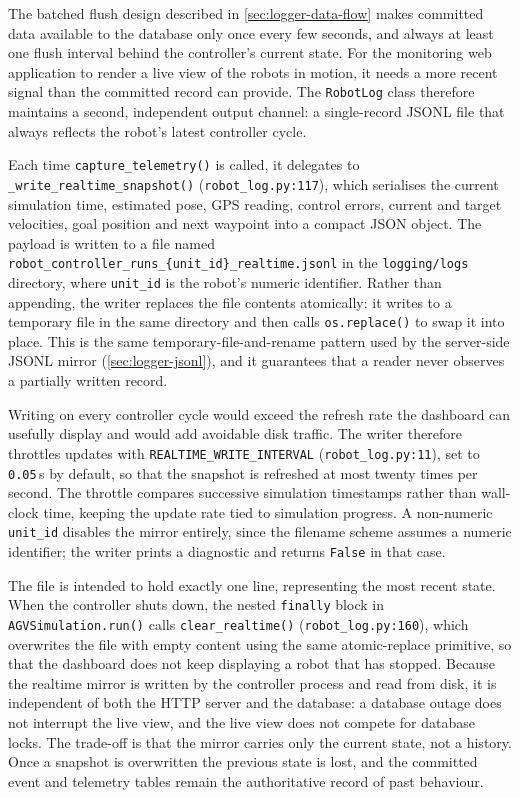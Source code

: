 The batched flush design described in \cref{sec:logger-data-flow} makes committed data available to the database only once every few seconds, and always at least one flush interval behind the controller's current state. For the monitoring web application to render a live view of the robots in motion, it needs a more recent signal than the committed record can provide. The \texttt{RobotLog} class therefore maintains a second, independent output channel: a single-record JSONL file that always reflects the robot's latest controller cycle.

Each time \texttt{capture\_telemetry()} is called, it delegates to \texttt{\_write\_realtime\_snapshot()} (\texttt{robot\_log.py:117}), which serialises the current simulation time, estimated pose, GPS reading, control errors, current and target velocities, goal position and next waypoint into a compact JSON object. The payload is written to a file named \texttt{robot\_controller\_runs\_\{unit\_id\}\_realtime.jsonl} in the \texttt{logging/logs} directory, where \texttt{unit\_id} is the robot's numeric identifier. Rather than appending, the writer replaces the file contents atomically: it writes to a temporary file in the same directory and then calls \texttt{os.replace()} to swap it into place. This is the same temporary-file-and-rename pattern used by the server-side JSONL mirror (\cref{sec:logger-jsonl}), and it guarantees that a reader never observes a partially written record.

Writing on every controller cycle would exceed the refresh rate the dashboard can usefully display and would add avoidable disk traffic. The writer therefore throttles updates with \texttt{REALTIME\_WRITE\_INTERVAL} (\texttt{robot\_log.py:11}), set to \texttt{0.05}\,s by default, so that the snapshot is refreshed at most twenty times per second. The throttle compares successive simulation timestamps rather than wall-clock time, keeping the update rate tied to simulation progress. A non-numeric \texttt{unit\_id} disables the mirror entirely, since the filename scheme assumes a numeric identifier; the writer prints a diagnostic and returns \texttt{False} in that case.

The file is intended to hold exactly one line, representing the most recent state. When the controller shuts down, the nested \texttt{finally} block in \texttt{AGVSimulation.run()} calls \texttt{clear\_realtime()} (\texttt{robot\_log.py:160}), which overwrites the file with empty content using the same atomic-replace primitive, so that the dashboard does not keep displaying a robot that has stopped. Because the realtime mirror is written by the controller process and read from disk, it is independent of both the HTTP server and the database: a database outage does not interrupt the live view, and the live view does not compete for database locks. The trade-off is that the mirror carries only the current state, not a history. Once a snapshot is overwritten the previous state is lost, and the committed event and telemetry tables remain the authoritative record of past behaviour.

